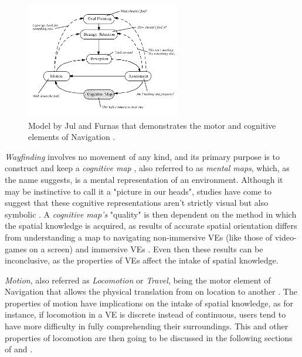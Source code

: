  \begin{figure}[b]
    \centering
    \includegraphics[width=0.6\textwidth]{NOVAthesisFiles/Images/papers/nav-model.png}
    \caption{Model by Jul and Furnas that demonstrates the motor and cognitive elements of Navigation \cite{Eastgate2014}.}
    \label{fig:nav-model}
\end{figure}

\textit{Wayfinding} involves no movement of any kind, and its primary purpose is to construct and keep a \textit{cognitive map}
 \cite{Langbehn2018}, also referred to as \textit{mental maps}, which, as the name suggests, is a mental representation of an environment. 
 Although it may be instinctive to call it a "picture in our heads", studies have come to suggest that these cognitive representations 
 aren't strictly visual but also symbolic \cite{Eastgate2014, Warren2019}. A \textit{cognitive map's} "quality" is then dependent on the 
 method in which the spatial knowledge is acquired, as results of accurate spatial orientation differs from understanding a map to navigating  
 non-immersive \glspl{VE} (like those of video-games on a screen) and immersive \glspl{VE} \cite{Eastgate2014,Santos2009}. Even then these 
 results can be inconclusive, as the properties of \glspl{VE} affect the intake of spatial knowledge.

\textit{Motion}, also referred as \textit{Locomotion} or \textit{Travel}, being the motor element of Navigation that allows the physical translation 
from on location to another \cite{Santos2009}. The properties of motion have implications on the intake of spatial knowledge, as for instance, 
if locomotion in a \gls{VE} is discrete instead of continuous, users tend to have more difficulty in fully comprehending their surroundings. This 
and other properties of locomotion are then going to be discussed in the following sections of  and 
.

